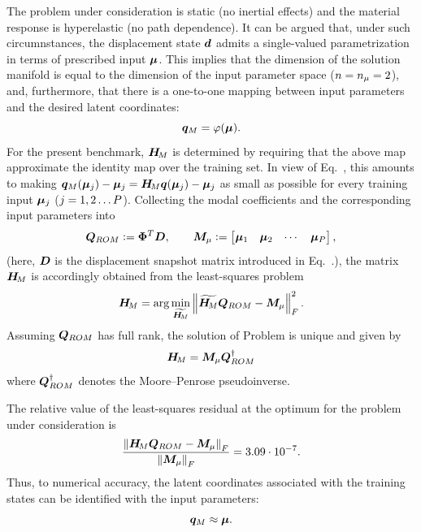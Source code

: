 \documentclass[preprint,10pt]{elsarticle}  %
\begin{document}
The  problem under consideration is static (no inertial effects) and the material response is hyperelastic (no path dependence). It can be argued that, under such circumnstances,   the displacement
state $\bm{d}$ admits a single-valued parametrization in terms of prescribed
  input \(\bm{\mu}\). This implies that the dimension of the solution manifold is   equal to the dimension of the input parameter space ($n=n_{\mu}=2$), and, furthermore, that   there is a one-to-one mapping between input parameters and the desired latent coordinates:
  \begin{equation}
   \bm{q}_M = \varphi(\bm{\mu}).
  \end{equation}
  For the present benchmark, \(\bm{H}_{\!M}\) is determined by requiring that the above map     approximate the identity
map over the training set. In view of Eq.~, this
amounts to making $
    \bm{q}_M(\bm{\mu}_j)-\bm{\mu}_j
    =
    \bm{H}_{\!M}\bm{q}(\bm{\mu}_j)-\bm{\mu}_j
$ as small as possible for every training input \(\bm{\mu}_j\) ($j=1,2 \ldots P$). Collecting
the modal coefficients and the corresponding input parameters into
\begin{equation}
\label{eq:meta_coordinate_matrices}
    \bm{Q}_{ROM}
    \mathrel{\mathop:}=
    \bm{\Phi}^T\bm{D},
    \qquad
    \bm{M}_{\mu}
    \mathrel{\mathop:}=
    \begin{bmatrix}
        \bm{\mu}_1 & \bm{\mu}_2 & \cdots & \bm{\mu}_{P}
    \end{bmatrix},
\end{equation}
(here, \(\bm{D}\) is the displacement snapshot matrix introduced in
Eq.~.), the matrix \(\bm{H}_{\!M}\) is accordingly obtained from the least-squares problem
\begin{equation}
\label{eq:least_squares_master_coordinates}
    \bm{H}_{\!M}
    =
    \arg\min_{\widetilde{\bm{H}_{\!M}}}
    \left\|
        \widetilde{\bm{H}_{\!M}}\bm{Q}_{ROM}-\bm{M}_{\mu}
    \right\|_F^2.
\end{equation}
  Assuming $\bm{Q}_{ROM}$ has full rank, the  solution of Problem  is unique and  given by
\begin{equation}
\label{eq:least_squares_master_coordinates_solution}
    \bm{H}_{\!M}
    =
    \bm{M}_{\mu}\bm{Q}_{ROM}^\dagger
\end{equation}
where \(\bm{Q}_{ROM}^\dagger\) denotes the Moore--Penrose pseudoinverse.

The relative value of the least-squares residual at the optimum for the problem under consideration is
\begin{equation}
\label{eq:latent_parameter_residual}
    \frac{
        \left\|\bm{H}_{\!M}\bm{Q}_{ROM}-\bm{M}_{\mu}\right\|_F
    }{
        \left\|\bm{M}_{\mu}\right\|_F
    }
    =
    3.09\cdot10^{-7}.
\end{equation}
Thus, to numerical accuracy, the latent coordinates associated with the
training states can be identified with the   input parameters:
\begin{equation}
\label{eq:input_aligned_coordinates}
    \bm{q}_M\approx\bm{\mu}.
\end{equation}
\end{document}
